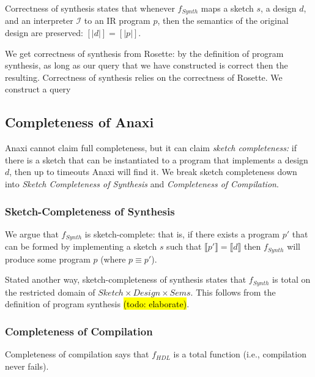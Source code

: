 Correctness of synthesis states that whenever $f_{Synth}$ maps a sketch $s$, a design $d$, and an interpreter $\mathcal{I}$ to an IR program $p$, then the semantics of the original design are preserved: $[|d|] = [|p|]$.

We get correctness of synthesis from Rosette: by the definition of program synthesis, as long as our query that we have constructed is correct then the resulting. Correctness of synthesis relies on the correctness of Rosette. We construct a query

\subsection{Completeness of Anaxi}

Anaxi cannot claim full completeness, but it can claim \textit{sketch completeness:} if there is a sketch that can be instantiated to a program that implements a design $d$, then up to timeouts Anaxi will find it. We break sketch completeness down into \textit{Sketch Completeness of Synthesis} and \textit{Completeness of Compilation}.

\subsubsection{ Sketch-Completeness of Synthesis}

We argue that $f_{Synth}$
  is sketch-complete: that is,
  if there exists a program $p'$
  that can be formed by
  implementing a sketch 
  $s$ such that
  $\llbracket p'\rrbracket = \llbracket d \rrbracket$
  then $f_{Synth}$ will
  produce some program 
  $p$ (where $p \equiv p'$).

Stated another way,
  sketch-completeness of
  synthesis states that $f_{Synth}$
  is total on the restricted 
  domain of 
  $Sketch \times Design \times Sems$.
This follows from the
  definition of program
  synthesis \hl{(todo: elaborate)}.

\subsubsection{Completeness of Compilation}

Completeness of compilation says that $f_{HDL}$ is a total function (i.e., compilation never fails).

